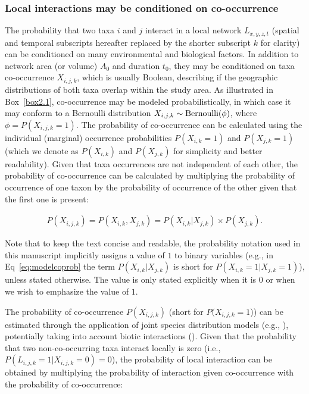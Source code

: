 \subsubsection{Local interactions may be conditioned on co-occurrence}

The probability that two taxa $i$ and $j$ interact in a local network
$L_{x,y,z,t}$ (spatial and temporal subscripts hereafter replaced by the shorter
subscript $k$ for clarity) can be conditioned on many environmental and
biological factors. In addition to network area (or volume) $A_0$ and duration
$t_0$, they may be conditioned on taxa co-occurrence $X_{i,j,k}$, which is
usually Boolean, describing if the geographic distributions of both taxa overlap
within the study area. As illustrated in Box~\ref{box2.1}, co-occurrence may be
modeled probabilistically, in which case it may conform to a Bernoulli
distribution $X_{i,j,k} \sim {\rm Bernoulli}(\phi)$, where $\phi = P(X_{i,j,k} =
1)$. The probability of co-occurrence can be calculated using the individual
(marginal) occurrence probabilities $P(X_{i,k} = 1)$ and $P(X_{j,k} = 1)$ (which
we denote as $P(X_{i, k})$ and $P(X_{j, k})$ for simplicity and better
readability). Given that taxa occurrences are not independent of each other, the
probability of co-occurrence can be calculated by multiplying the probability of
occurrence of one taxon by the probability of occurrence of the other given that
the first one is present: 

\begin{eqnarray}
  \label{eq:modelcoprob}
     P(X_{i,j,k}) = P(X_{i,k}, X_{j,k})= P(X_{i,k} | X_{j,k}) \times P(X_{j,k}).
\end{eqnarray}

Note that to keep the text concise and readable, the probability notation used
in this manuscript implicitly assigns a value of $1$ to binary variables (e.g.,
in Eq~\ref{eq:modelcoprob} the term $P(X_{i,k} | X_{j,k})$ is short for
$P(X_{i,k} = 1 | X_{j,k} = 1)$), unless stated otherwise. The value is only
stated explicitly when it is $0$ or when we wish to emphasize the value of $1$.

The probability of co-occurrence $P(X_{i,j,k})$ (short for $P(X_{i,j,k} = 1$))
can be estimated through the application of joint species distribution models
(e.g., \cite{Pollock2014Understanding}), potentially taking into account biotic
interactions (\cite{Staniczenko2017Linking}). Given that the probability that
two non-co-occurring taxa interact locally is zero (i.e., $P(L_{i, j, k} = 1|
X_{i,j,k} = 0) = 0$), the probability of local interaction can be obtained by
multiplying the probability of interaction given co-occurrence with the
probability of co-occurrence: 

